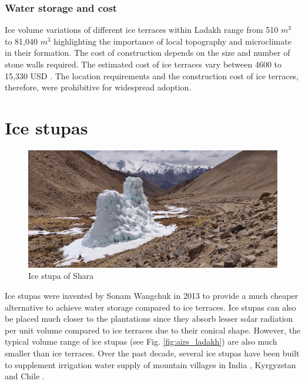 \subsubsection{Water storage and cost}

Ice volume variations of different ice terraces within Ladakh  range from 510 $m^3$ to 81,040 $m^3$
\citep{nusserSociohydrologyArtificialGlaciers2019, norphelSnowWaterHarvesting2015} highlighting the importance
of local topography and microclimate in their formation. The cost of construction depends on the size and number
of stone walls required. The estimated cost of ice terraces vary between 4600 to 15,330 USD
\cite{nusserSociohydrologyArtificialGlaciers2019}. The location requirements and the construction cost of ice
terraces, therefore, were prohibitive for widespread adoption.

\section{Ice stupas}

\begin{figure}[htb]
\centering
\includegraphics[width=12cm]{figs/IS_example.jpg}
\caption{Ice stupa of Shara}
\label{fig:ISexample}
\end{figure}

Ice stupas were invented by Sonam Wangchuk in 2013 \cite{wangchukIceStupaArtificial2014} to provide a much
cheaper alternative to achieve water storage compared to ice terraces. Ice stupas can also be placed much closer
to the plantations since they absorb lesser solar radiation per unit volume compared to ice terraces due to
their conical shape. However, the typical volume range of ice stupas (see Fig. \ref{fig:airs_ladakh}) are also
much smaller than ice terraces. Over the past decade, several ice stupas have been built to supplement
irrigation water supply of mountain villages in India \citep{wangchukIceStupaCompetition2020,
palmerStoringFrozenWater2022, aggarwalAdaptationClimateChange2021}, Kyrgyzstan
\citep{bbcnewsBrightArtificialGlacier2020} and Chile \citep{reutersConservationistsChileAim2021}.

